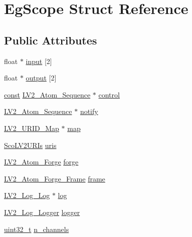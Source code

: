 \hypertarget{struct_eg_scope}{}\section{Eg\+Scope Struct Reference}
\label{struct_eg_scope}
\subsection*{Public Attributes}
\begin{DoxyCompactItemize}
\item 
float $\ast$ \hyperlink{struct_eg_scope_ac1dc1a1be6ff4b3c41c9fc8ce0e396e8}{input} \mbox{[}2\mbox{]}
\item 
float $\ast$ \hyperlink{struct_eg_scope_a436eaf57cf483d9510bbeea14229bf97}{output} \mbox{[}2\mbox{]}
\item 
\hyperlink{getopt1_8c_a2c212835823e3c54a8ab6d95c652660e}{const} \hyperlink{struct_l_v2___atom___sequence}{L\+V2\+\_\+\+Atom\+\_\+\+Sequence} $\ast$ \hyperlink{struct_eg_scope_a880393b81c269e0d86daaa946a3907e2}{control}
\item 
\hyperlink{struct_l_v2___atom___sequence}{L\+V2\+\_\+\+Atom\+\_\+\+Sequence} $\ast$ \hyperlink{struct_eg_scope_a8a055e1fb298f3284f9817e573ebe0dc}{notify}
\item 
\hyperlink{urid_8h_afefb42cd271f750506a8739f73c098c5}{L\+V2\+\_\+\+U\+R\+I\+D\+\_\+\+Map} $\ast$ \hyperlink{struct_eg_scope_aaeed3951c107c890a3f1da371918096d}{map}
\item 
\hyperlink{struct_sco_l_v2_u_r_is}{Sco\+L\+V2\+U\+R\+Is} \hyperlink{struct_eg_scope_a36cdd1cd4ee3b6ffa16c22f9017013cb}{uris}
\item 
\hyperlink{struct_l_v2___atom___forge}{L\+V2\+\_\+\+Atom\+\_\+\+Forge} \hyperlink{struct_eg_scope_a11b58dfd26f9473845bdec01ab5130d2}{forge}
\item 
\hyperlink{forge_8h_a17754ac32fadfa54b73978e8a535065b}{L\+V2\+\_\+\+Atom\+\_\+\+Forge\+\_\+\+Frame} \hyperlink{struct_eg_scope_ab37671abca7974702ddfdd2b24540403}{frame}
\item 
\hyperlink{lv2_2lv2_2lv2_2lv2plug_8in_2ns_2ext_2log_2log_8h_a80f0e839a976477f3133ca6353a42bbc}{L\+V2\+\_\+\+Log\+\_\+\+Log} $\ast$ \hyperlink{struct_eg_scope_aa9b2382c35b2bf9aca3452f4f1759fce}{log}
\item 
\hyperlink{struct_l_v2___log___logger}{L\+V2\+\_\+\+Log\+\_\+\+Logger} \hyperlink{struct_eg_scope_ae5c945f9302b5e46390b62361eba3f73}{logger}
\item 
\hyperlink{lib-src_2ffmpeg_2win32_2stdint_8h_a6eb1e68cc391dd753bc8ce896dbb8315}{uint32\+\_\+t} \hyperlink{struct_eg_scope_a88856e693c22a483c684cdec70f0b359}{n\+\_\+channels}

\end{DoxyCompactItemize}
